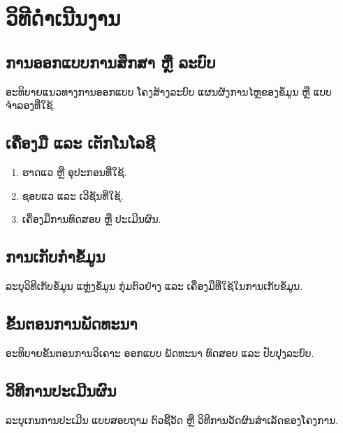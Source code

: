 \chapter{ວິທີດຳເນີນງານ}

\section{ການອອກແບບການສຶກສາ ຫຼື ລະບົບ}
ອະທິບາຍແນວທາງການອອກແບບ ໂຄງສ້າງລະບົບ ແຜນຜັງການໄຫຼຂອງຂໍ້ມູນ ຫຼື ແບບຈຳລອງທີ່ໃຊ້.

\section{ເຄື່ອງມື ແລະ ເຕັກໂນໂລຊີ}
\begin{enumerate}
  \item ຮາດແວ ຫຼື ອຸປະກອນທີ່ໃຊ້.
  \item ຊອບແວ ແລະ ເວີຊັນທີ່ໃຊ້.
  \item ເຄື່ອງມືການທົດສອບ ຫຼື ປະເມີນຜົນ.
\end{enumerate}

\section{ການເກັບກຳຂໍ້ມູນ}
ລະບຸວິທີເກັບຂໍ້ມູນ ແຫຼ່ງຂໍ້ມູນ ກຸ່ມຕົວຢ່າງ ແລະ ເຄື່ອງມືທີ່ໃຊ້ໃນການເກັບຂໍ້ມູນ.

\section{ຂັ້ນຕອນການພັດທະນາ}
ອະທິບາຍຂັ້ນຕອນການວິເຄາະ ອອກແບບ ພັດທະນາ ທົດສອບ ແລະ ປັບປຸງລະບົບ.

\section{ວິທີການປະເມີນຜົນ}
ລະບຸເກນການປະເມີນ ແບບສອບຖາມ ຕົວຊີ້ວັດ ຫຼື ວິທີການວັດຜົນສຳເລັດຂອງໂຄງການ.
